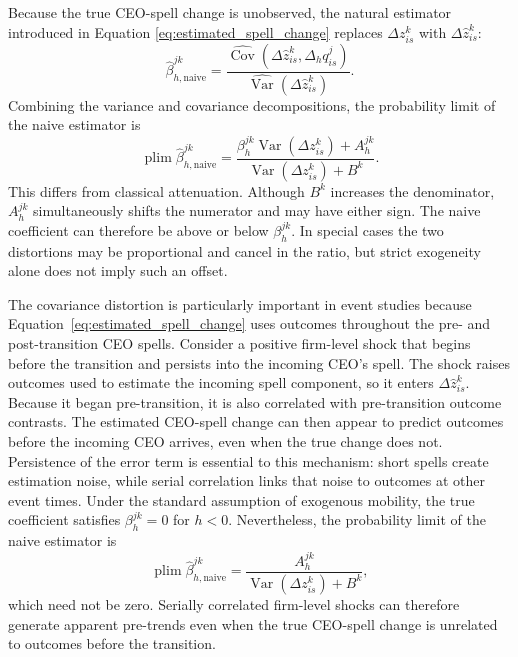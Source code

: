 \documentclass[sigconf,nonacm]{acmart}
\begin{document}
Because the true CEO-spell change is unobserved, the natural estimator introduced in Equation \ref{eq:estimated_spell_change}
replaces $\Delta z_{is}^{k}$ with $\Delta\widehat z_{is}^{k}$:
\begin{equation}
\widehat\beta_{h,\mathrm{naive}}^{jk}
=
\frac{
\widehat{\operatorname{Cov}}\!\left(
\Delta\widehat z_{is}^{k},
\Delta_h q_{is}^{j}
\right)
}{
\widehat{\operatorname{Var}}\!\left(
\Delta\widehat z_{is}^{k}
\right)
}.
\label{eq:naive_beta}
\end{equation}
Combining the variance and covariance decompositions, the probability
limit of the naive estimator is
\begin{equation}
\operatorname{plim}
\widehat\beta_{h,\mathrm{naive}}^{jk}
=
\frac{
\beta_h^{jk}
\operatorname{Var}\!\left(
\Delta z_{is}^{k}
\right)
+
A_h^{jk}
}{
\operatorname{Var}\!\left(
\Delta z_{is}^{k}
\right)
+
B^{k}
}.
\label{eq:naive_beta_plim}
\end{equation}
This differs from classical attenuation. Although $B^k$ increases the denominator, $A_h^{jk}$ simultaneously shifts the numerator and may have either sign. The naive coefficient can therefore be above or below $\beta_h^{jk}$. In special cases the two distortions may be proportional and cancel in the ratio, but strict exogeneity alone does not imply such an offset.

The covariance distortion is particularly important in event studies because Equation~\eqref{eq:estimated_spell_change} uses outcomes throughout the pre- and post-transition CEO spells. Consider a positive firm-level shock that begins before the transition and persists into the incoming CEO's spell. The shock raises outcomes used to estimate the incoming spell component, so it enters $\Delta\widehat z_{is}^{k}$. Because it began pre-transition, it is also correlated with pre-transition outcome contrasts. The estimated CEO-spell change can then appear to predict outcomes before the incoming CEO arrives, even when the true change does not. Persistence of the error term is essential to this mechanism: short spells create estimation noise, while serial correlation links that noise to outcomes at other event times. Under the standard assumption of exogenous mobility, the true coefficient satisfies $\beta_h^{jk}=0$ for $h<0$. Nevertheless, the probability limit of the naive estimator is
\begin{equation}
\operatorname{plim}
\widehat\beta_{h,\mathrm{naive}}^{jk}
=
\frac{
A_h^{jk}
}{
\operatorname{Var}\!\left(
\Delta z_{is}^{k}
\right)
+
B^{k}
},
\label{eq:pretrend_bias}
\end{equation}
which need not be zero. Serially correlated firm-level shocks can
therefore generate apparent pre-trends even when the true CEO-spell
change is unrelated to outcomes before the transition.
\end{document}
